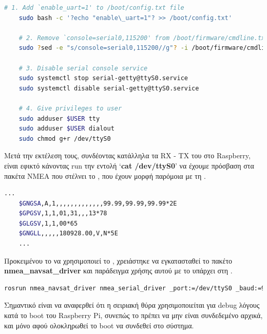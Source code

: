 \begin{lstlisting}[language=bash, escapechar=?, caption={Fix serial communication},label=list:fix-serial-communication]
    # 1. Add `enable_uart=1' to /boot/config.txt file
    sudo bash -c '?echo "enable\_uart=1"? >> /boot/config.txt'

    # 2. Remove `console=serial0,115200' from /boot/firmware/cmdline.txt
    sudo ?sed -e "s/console=serial0,115200//g"? -i /boot/firmware/cmdline.txt

    # 3. Disable serial console service
    sudo systemctl stop serial-getty@ttyS0.service
    sudo systemctl disable serial-getty@ttyS0.service

    # 4. Give privileges to user
    sudo adduser $USER tty
    sudo adduser $USER dialout
    sudo chmod g+r /dev/ttyS0
\end{lstlisting}

Μετά την εκτέλεση τους, συνδέοντας κατάλληλα τα RX - TX του  στο Ra\-spbe\-rry, είναι εφικτό κάνοντας run την εντολή `\textbf{cat /dev/ttyS0}' να έχουμε πρόσβαση στα πακέτα NMEA που στέλνει το , που έχουν μορφή παρόμοια με τη .

\begin{lstlisting}[language=bash, escapechar=@, caption={Serial Output, NMEA packets example},label=list:serial-output]
    ...
    $GNGSA,A,1,,,,,,,,,,,,,99.99,99.99,99.99*2E
    $GPGSV,1,1,01,31,,,13*78
    $GLGSV,1,1,00*65
    $GNGLL,,,,,180928.00,V,N*5E
    ...
\end{lstlisting}

Προκειμένου το  να χρησιμοποιεί το , χρειάστηκε να εγκατασταθεί το πακέτο \textbf{nmea\_navsat\_driver} \cite{nmea-navsat-driver} και παράδειγμα χρήσης αυτού με το  υπάρχει στη .  

\begin{lstlisting}[language=bash, escapechar=@, caption={GPS - ROS sample usage},label=list:gps-ros-sample-usage]
    rosrun nmea_navsat_driver nmea_serial_driver _port:=/dev/ttyS0 _baud:=9600 
\end{lstlisting}

Σημαντικό είναι να αναφερθεί ότι η σειριακή θύρα χρησιμοποιείται για debug λόγους κατά το boot
του Raspberry Pi, συνεπώς το  πρέπει να μην είναι συνδεδεμένο αρχικά, και μόνο αφού ολοκληρωθεί το boot να συνδεθεί στο σύστημα.


